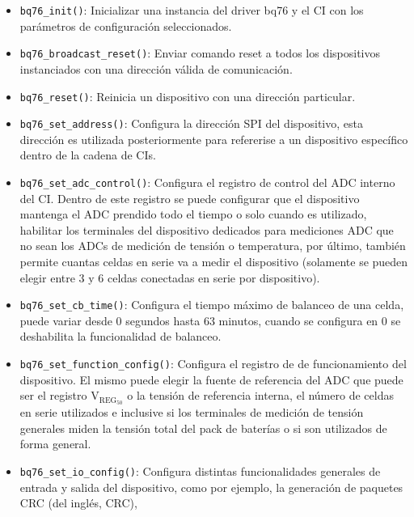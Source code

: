 \documentclass[10pt, a4paper]{article}
\begin{document}
\begin{itemize}
    \item \texttt{bq76\_init()}: Inicializar una instancia del driver bq76 y
        el \acrshort{CI} con los parámetros de configuración seleccionados.
    \item \texttt{bq76\_broadcast\_reset()}: Enviar comando reset a todos los
        dispositivos instanciados con una dirección válida de comunicación.
    \item \texttt{bq76\_reset()}: Reinicia un dispositivo con una direcci\'on
        particular.
    \item \texttt{bq76\_set\_address()}: Configura la direcci\'on \acrshort{SPI}
        del dispositivo, esta direcci\'on es utilizada posteriormente para
        refererise a un dispositivo espec\'ifico dentro de la cadena de
        \acrshort{CI}s.
    \item \texttt{bq76\_set\_adc\_control()}: Configura el registro de control
        del \acrshort{ADC} interno del \acrshort{CI}. Dentro de este registro se
        puede configurar que el dispositivo mantenga el \acrshort{ADC} prendido
        todo el tiempo o solo cuando es utilizado, habilitar los terminales del
        dispositivo dedicados para mediciones \acrshort{ADC} que no sean los
        \acrshort{ADC}s de medici\'on de tensi\'on o temperatura, por \'ultimo,
        tambi\'en permite cuantas celdas en serie va a medir el dispositivo
        (solamente se pueden elegir entre 3 y 6 celdas conectadas en serie por
        dispositivo).
    \item \texttt{bq76\_set\_cb\_time()}: Configura el tiempo m\'aximo de 
        balanceo de una celda, puede variar desde 0 segundos hasta 63 minutos,
        cuando se configura en 0 se deshabilita la funcionalidad de balanceo.
    \item \texttt{bq76\_set\_function\_config()}: Configura el registro de 
        de funcionamiento del dispositivo. El mismo puede elegir la fuente de
        referencia del \acrshort{ADC} que puede ser el registro
        $\mathrm{V_{REG_{50}}}$ o la tensi\'on de referencia interna, el
        n\'umero de celdas en serie utilizados e inclusive si los terminales de
        medici\'on de tensi\'on generales miden la tensi\'on total del pack de
        bater\'ias o si son utilizados de forma general.
    \item \texttt{bq76\_set\_io\_config()}: Configura distintas funcionalidades
        generales de entrada y salida del dispositivo, como por ejemplo, la
        generaci\'on de paquetes \acrshort{CRC} (del ingl\'es, \acrlong{CRC}),

\end{itemize}
\end{document}
